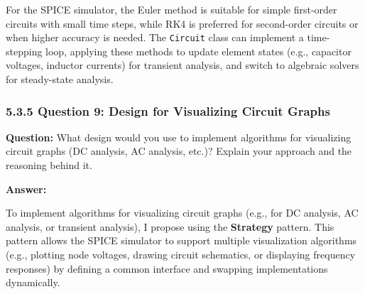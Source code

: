 \documentclass{article}
\begin{document}
For the SPICE simulator, the Euler method is suitable for simple first-order circuits with small time steps, while RK4 is preferred for second-order circuits or when higher accuracy is needed. The \texttt{Circuit} class can implement a time-stepping loop, applying these methods to update element states (e.g., capacitor voltages, inductor currents) for transient analysis, and switch to algebraic solvers for steady-state analysis.

\subsubsection*{5.3.5 Question 9: Design for Visualizing Circuit Graphs}

\textbf{Question:} What design would you use to implement algorithms for visualizing circuit graphs (DC analysis, AC analysis, etc.)? Explain your approach and the reasoning behind it.

\textbf{Answer:}

To implement algorithms for visualizing circuit graphs (e.g., for DC analysis, AC analysis, or transient analysis), I propose using the \textbf{Strategy} pattern. This pattern allows the SPICE simulator to support multiple visualization algorithms (e.g., plotting node voltages, drawing circuit schematics, or displaying frequency responses) by defining a common interface and swapping implementations dynamically.
\end{document}
